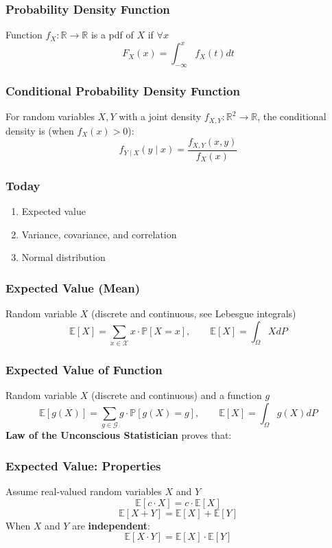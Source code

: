 \documentclass{beamer}
\newcommand{\E}[1]{\mathbb{E}\left[#1\right]}
\newcommand{\Real}{\mathbb{R}}
\renewcommand{\P}[1]{\mathbb{P}\left[#1\right]}
\begin{document}
\begin{frame} \frametitle{Probability Density Function}
  Function $f_X\colon \Real \to \Real$ is a pdf of $X$ if $\forall x$
  \[
   F_X(x)  = \int_{-\infty}^x f_X(t) dt 
 \]
 \vspace{4cm}
\end{frame}

\begin{frame} \frametitle{Conditional Probability Density Function}
  For random variables $X, Y$ with a joint density $f_{X,Y}\colon \Real^2 \to \Real$, the conditional density is (when $f_X(x) > 0$):
  \[
   f_{Y \mid X}(y \mid  x) = \frac{f_{X,Y}(x,y)}{f_X(x)}
 \]
 \vspace{4cm}
\end{frame}

\begin{frame} \frametitle{Today}
  \begin{enumerate}
  \item Expected value
  \item Variance, covariance, and correlation
  \item Normal distribution
  \end{enumerate}
\end{frame}


\begin{frame} \frametitle{Expected Value (Mean)}
  Random variable $X$ (discrete and continuous, see Lebesgue integrals)
  \[
   \E{X} = \sum_{x\in \mathcal{X}} x \cdot \P{X = x},  \qquad  \E{X} = \int_{\Omega } X dP 
  \]
  \vspace{5cm}
\end{frame}

\begin{frame} \frametitle{Expected Value of Function}
  Random variable $X$ (discrete and continuous) and a function $g$
  \[
    \E{g(X)} = \sum_{g\in \mathcal{G}} g \cdot \P{g(X) = g},  \qquad
    \E{X} = \int_{\Omega } g(X) dP 
 \]
 \textbf{ Law of the Unconscious Statistician} proves that:
  \vspace{5cm}
\end{frame}

\begin{frame} \frametitle{Expected Value: Properties}
  Assume real-valued random variables $X$ and $Y$
  \[ \E{ c\cdot X } = c \cdot  \E{ X } \]
  \vfill
  \[ \E{ X + Y  } = \E{ X } + \E{ Y } \]
  \vfill
  When $X$ and $Y$ are \textbf{independent}:
  \[ \E{ X \cdot Y  } = \E{ X } \cdot \E{ Y } \]
\end{frame}
\end{document}
